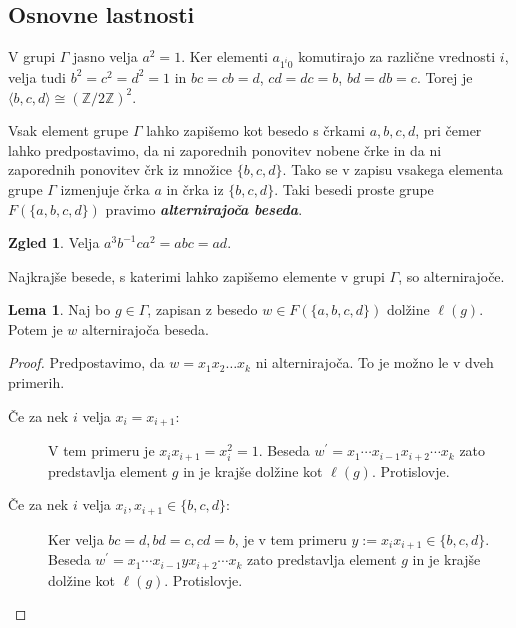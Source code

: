 \documentclass[11pt]{book}
\def\ZZ{\mathbb{Z}}
\def\definicija{\color{rdeca}\bf\em}
\theoremstyle{definition}
\theoremstyle{zgled}
\newtheorem*{zgled}{Zgled}
\theoremstyle{odprtproblem}
\theoremstyle{domacanaloga}
\newenvironment{dokaz}
    {\color{siva}\begin{proof}}
    {\end{proof}}
\theoremstyle{izrek}
\newtheorem*{lema}{Lema}
\begin{document}
\subsection{Osnovne lastnosti}

V grupi $\Gamma$ jasno velja $a^2 = 1$. Ker elementi $a_{1^i0}$ komutirajo za različne vrednosti $i$, velja tudi $b^2 = c^2 = d^2 = 1$ in $bc = cb = d$, $cd = dc = b$, $bd = db = c$. Torej je $\langle b,c,d \rangle \cong (\ZZ/2\ZZ)^2$.

Vsak element grupe $\Gamma$ lahko zapišemo kot besedo s črkami $a,b,c,d$, pri čemer lahko predpostavimo, da ni zaporednih ponovitev nobene črke in da ni zaporednih ponovitev črk iz množice $\{ b,c,d \}$. Tako se v zapisu vsakega elementa grupe $\Gamma$ izmenjuje črka $a$ in črka iz $\{ b,c,d \}$. Taki besedi proste grupe $F(\{ a,b,c,d \})$ pravimo {\definicija alternirajoča beseda}.

\begin{zgled}
Velja $a^3 b^{-1} c a^2 = a b c = ad$.
\end{zgled}

Najkrajše besede, s katerimi lahko zapišemo elemente v grupi $\Gamma$, so alternirajoče.

\begin{lema}
Naj bo $g \in \Gamma$, zapisan z besedo $w \in F(\{ a,b,c,d \})$ dolžine $\ell(g)$. Potem je $w$ alternirajoča beseda. 
\end{lema}

\begin{dokaz}
Predpostavimo, da $w = x_1 x_2 \dots x_k$ ni alternirajoča. To je možno le v dveh primerih.

\begin{description}
    \item[Če za nek $i$ velja $x_i = x_{i+1}$:] V tem primeru je $x_i x_{i+1} = x_i^2 = 1$. Beseda $w^\prime = x_1 \cdots x_{i-1} x_{i+2} \cdots x_k$ zato predstavlja element $g$ in je krajše dolžine kot $\ell(g)$. Protislovje.

    \item[Če za nek $i$ velja $x_i, x_{i+1} \in \{b,c,d\}$:] Ker velja $bc = d, bd=c, cd = b$, je v tem primeru $y := x_i x_{i+1} \in \{b,c,d\}$. Beseda $w^\prime = x_1 \cdots x_{i-1} y x_{i+2} \cdots x_k$ zato predstavlja element $g$ in je krajše dolžine kot $\ell(g)$. Protislovje.
\end{description}\vspace{-1.5\baselineskip}
\end{dokaz}
\end{document}
